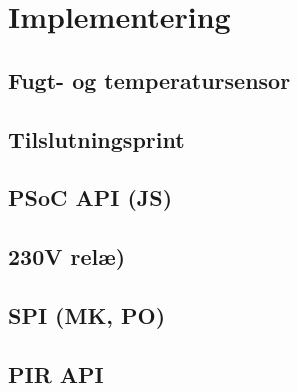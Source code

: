 \chapter{Implementering}


\section{Fugt- og temperatursensor}


\section{Tilslutningsprint}


\section{PSoC API (JS)}


\section{230V relæ)}


\section{SPI (MK, PO)}


\section{PIR API}




